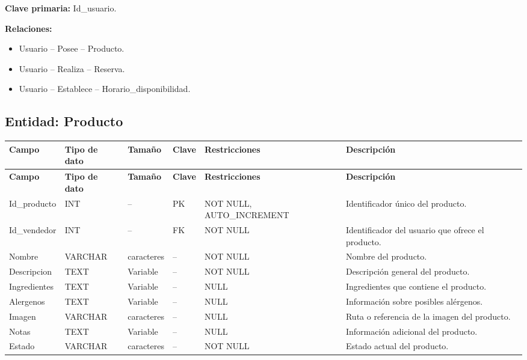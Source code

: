 \documentclass[12pt]{article} %
\begin{document}
\textbf{Clave primaria:} Id\_usuario.

\textbf{Relaciones:}
\begin{itemize}
    \item Usuario -- Posee -- Producto.
    \item Usuario -- Realiza -- Reserva.
    \item Usuario -- Establece -- Horario\_disponibilidad.
\end{itemize}



\subsection{Entidad: Producto}

\begin{longtable}{>{\raggedright\arraybackslash}p{2.5cm}
                  >{\raggedright\arraybackslash}p{2.0cm}
                  >{\raggedright\arraybackslash}p{2.2cm}
                  >{\raggedright\arraybackslash}p{1.2cm}
                  >{\raggedright\arraybackslash}p{3.0cm}
                  >{\raggedright\arraybackslash}p{4.0cm}}
\toprule
\textbf{Campo} &
\textbf{Tipo de dato} &
\textbf{Tamaño} &
\textbf{Clave} &
\textbf{Restricciones} &
\textbf{Descripción} \\
\midrule
\endfirsthead

\toprule
\textbf{Campo} &
\textbf{Tipo de dato} &
\textbf{Tamaño} &
\textbf{Clave} &
\textbf{Restricciones} &
\textbf{Descripción} \\
\midrule
\endhead

Id\_producto &
INT &
-- &
PK &
NOT NULL, AUTO\_INCREMENT &
Identificador único del producto. \\

Id\_vendedor &
INT &
-- &
FK &
NOT NULL &
Identificador del usuario que ofrece el producto. \\

Nombre &
VARCHAR &
100 caracteres &
-- &
NOT NULL &
Nombre del producto. \\

Descripcion &
TEXT &
Variable &
-- &
NOT NULL &
Descripción general del producto. \\

Ingredientes &
TEXT &
Variable &
-- &
NULL &
Ingredientes que contiene el producto. \\

Alergenos &
TEXT &
Variable &
-- &
NULL &
Información sobre posibles alérgenos. \\

Imagen &
VARCHAR &
255 caracteres &
-- &
NULL &
Ruta o referencia de la imagen del producto. \\

Notas &
TEXT &
Variable &
-- &
NULL &
Información adicional del producto. \\

Estado &
VARCHAR &
20 caracteres &
-- &
NOT NULL &
Estado actual del producto. \\

\bottomrule
\end{longtable}
\end{document}
